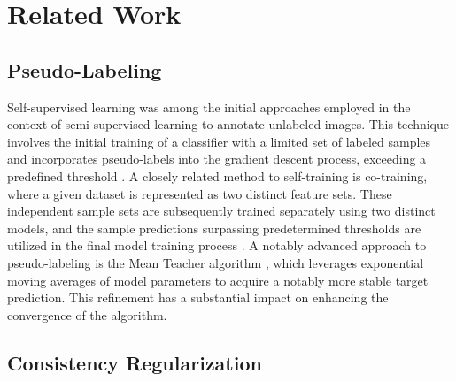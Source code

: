 \documentclass[10pt,twocolumn,letterpaper]{article}
\begin{document}




\section{Related Work}



\subsection{Pseudo-Labeling}
Self-supervised learning was among the initial approaches employed in the context of semi-supervised learning to annotate unlabeled images. 
This technique involves the initial training of a classifier with a limited set of labeled samples and incorporates pseudo-labels into the gradient descent process, exceeding a predefined threshold \cite{yarowsky1995unsupervised, mcclosky2006reranking, olivier2006semi,zhai2019s4l,livieris2019predicting,rosenberg2005semi}. 
A closely related method to self-training is co-training, where a given dataset is represented as two distinct feature sets. 
These independent sample sets are subsequently trained separately using two distinct models, and the sample predictions surpassing predetermined thresholds are utilized in the final model training process \cite{blum1998combining,prakash2014survey}.
A notably advanced approach to pseudo-labeling is the Mean Teacher algorithm \cite{tarvainen2017mean}, which leverages exponential moving averages of model parameters to acquire a notably more stable target prediction. 
This refinement has a substantial impact on enhancing the convergence of the algorithm.


\subsection{Consistency Regularization}
\end{document}
